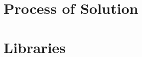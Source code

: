 \documentclass{scrartcl}
\begin{document}
\section{Process of Solution}

\section{Libraries}
%
\end{document}
